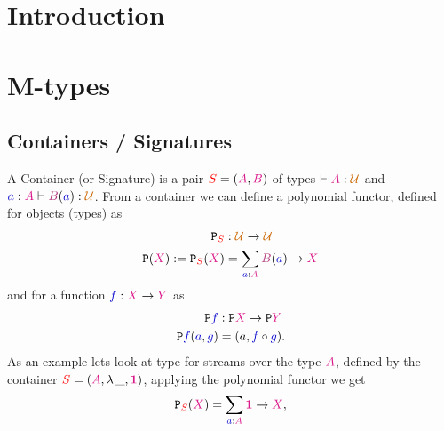 \documentclass[twoside,11pt,openright]{report}
\newcommand*{\term}[1]{\textcolor{blue!80!black}{#1}}
\newcommand*{\type}[1]{\textcolor{magenta!90!black}{#1}}
\newcommand*{\dependenttype}[1]{\textcolor{magenta!70!black}{#1}}
\newcommand*{\container}[1]{\textcolor{red}{#1}}
\newcommand*{\universe}[1]{\textcolor{orange!80!black}{#1}}
\newcommand*{\unit}{\type{\textbf{1}}}
\newcommand*{\functor}[1]{\ensuremath{\mathbf{\mathtt{#1}}}}
\begin{document}
\chapter{Introduction}
\label{ch:intro}




\chapter{M-types}
\label{ch:m-types}

\section{Containers / Signatures}
A Container (or Signature) is a pair \(\container{S} = (\type{A},\type{B})\) of types \(\vdash \type{A} : \universe{\mathcal{U}}\) and \(\term{a} : \type{A} \vdash \dependenttype{B}(\term{a}) : \universe{\mathcal{U}}\). From a container we can define a polynomial functor, defined for objects (types) as
\begin{equation}
  \begin{aligned}
    \functor{P}_{\container{S}} &: \universe{\mathcal{U}} \rightarrow \universe{\mathcal{U}} \\
    \functor{P}(\type{X}) := \functor{P}_{\container{S}}(\type{X}) &= \sum_{\term{a} : \type{A}} \dependenttype{B}(\term{a}) \rightarrow \type{X}
  \end{aligned}
\end{equation}
and for a function \(\term{f} : \type{X} \rightarrow \type{Y}\) as
\begin{equation}
  \begin{aligned}
    \functor{P}\term{f} &: \functor{P}\type{X} \rightarrow \functor{P}\type{Y} \\
    \functor{P}\term{f}(\term{a},\term{g}) &= (a, \term{f} \circ \term{g}).
  \end{aligned}
\end{equation}
As an example lets look at type for streams over the type \(\type{A}\), defined by the container \(\container{S} = (\type{A},\lambda\,\_, \unit)\), applying the polynomial functor we get
\begin{equation}
  \functor{P}_{\container{S}}(\type{X}) = \sum_{\term{a} : \type{A}} \unit \rightarrow \type{X},
\end{equation}
\end{document}

